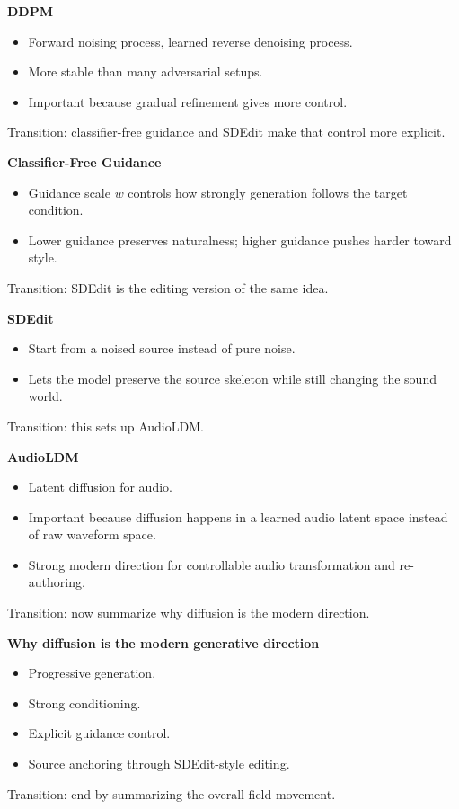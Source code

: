 \documentclass[11pt]{article}
\begin{document}
\textbf{DDPM}
\begin{itemize}
\item Forward noising process, learned reverse denoising process.
\item More stable than many adversarial setups.
\item Important because gradual refinement gives more control.
\end{itemize}
\textcolor{Muted}{Transition: classifier-free guidance and SDEdit make that control more explicit.}

\textbf{Classifier-Free Guidance}
\begin{itemize}
\item Guidance scale \(w\) controls how strongly generation follows the target condition.
\item Lower guidance preserves naturalness; higher guidance pushes harder toward style.
\end{itemize}
\textcolor{Muted}{Transition: SDEdit is the editing version of the same idea.}

\textbf{SDEdit}
\begin{itemize}
\item Start from a noised source instead of pure noise.
\item Lets the model preserve the source skeleton while still changing the sound world.
\end{itemize}
\textcolor{Muted}{Transition: this sets up AudioLDM.}

\textbf{AudioLDM}
\begin{itemize}
\item Latent diffusion for audio.
\item Important because diffusion happens in a learned audio latent space instead of raw waveform space.
\item Strong modern direction for controllable audio transformation and re-authoring.
\end{itemize}
\textcolor{Muted}{Transition: now summarize why diffusion is the modern direction.}

\textbf{Why diffusion is the modern generative direction}
\begin{itemize}
\item Progressive generation.
\item Strong conditioning.
\item Explicit guidance control.
\item Source anchoring through SDEdit-style editing.
\end{itemize}
\textcolor{Muted}{Transition: end by summarizing the overall field movement.}
\end{document}
